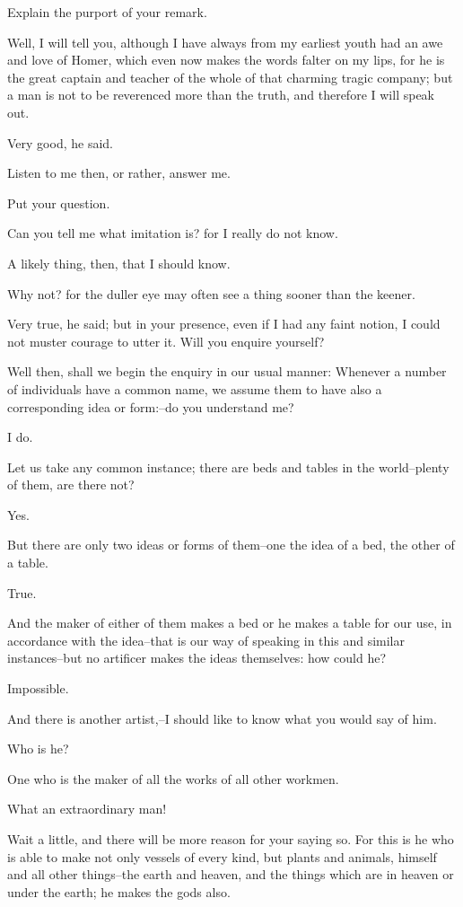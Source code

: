 Explain the purport of your remark.

Well, I will tell you, although I have always from my earliest youth had
an awe and love of Homer, which even now makes the words falter on
my lips, for he is the great captain and teacher of the whole of that
charming tragic company; but a man is not to be reverenced more than the
truth, and therefore I will speak out.

Very good, he said.

Listen to me then, or rather, answer me.

Put your question.

Can you tell me what imitation is? for I really do not know.

A likely thing, then, that I should know.

Why not? for the duller eye may often see a thing sooner than the
keener.

Very true, he said; but in your presence, even if I had any faint
notion, I could not muster courage to utter it. Will you enquire
yourself?

Well then, shall we begin the enquiry in our usual manner: Whenever a
number of individuals have a common name, we assume them to have also a
corresponding idea or form:--do you understand me?

I do.

Let us take any common instance; there are beds and tables in the
world--plenty of them, are there not?

Yes.

But there are only two ideas or forms of them--one the idea of a bed,
the other of a table.

True.

And the maker of either of them makes a bed or he makes a table for our
use, in accordance with the idea--that is our way of speaking in this
and similar instances--but no artificer makes the ideas themselves: how
could he?

Impossible.

And there is another artist,--I should like to know what you would say
of him.

Who is he?

One who is the maker of all the works of all other workmen.

What an extraordinary man!

Wait a little, and there will be more reason for your saying so. For
this is he who is able to make not only vessels of every kind, but
plants and animals, himself and all other things--the earth and heaven,
and the things which are in heaven or under the earth; he makes the gods
also.


